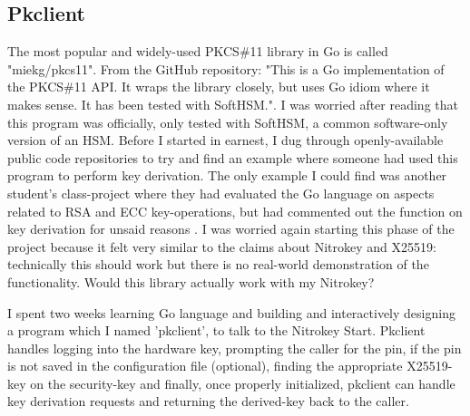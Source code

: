 \documentclass [11pt, proquest] {uwthesis}[2020/02/24]
\begin{document}
\subsection{Pkclient}
\label{pk_design}
The most popular and widely-used PKCS\#11 library in Go is called "miekg/pkcs11". From the GitHub repository: "This is a Go implementation of the PKCS\#11 API. It wraps the library closely, but uses Go idiom where it makes sense. It has been tested with SoftHSM."\cite{gieben_pkcs11_2022}. 
I was worried after reading that this program was officially, only tested with SoftHSM, a common software-only version of an HSM. Before I started in earnest, I dug through openly-available public code repositories to try and find an example where someone had used this program to perform key derivation. The only example I could find was another student's class-project where they had evaluated the Go language on aspects related to RSA and ECC key-operations, but had commented out the function on key derivation for unsaid reasons \cite{quapka_go-analysis_2019}. I was worried again starting this phase of the project because it felt very similar to the claims about Nitrokey and X25519: technically this should work but there is no real-world demonstration of the functionality. Would this library actually work with my Nitrokey?

I spent two weeks learning Go language and building and interactively designing a program which I named 'pkclient', to talk to the Nitrokey Start. Pkclient handles logging into the hardware key, prompting the caller for the pin, if the pin is not saved in the configuration file (optional), finding the appropriate X25519-key on the security-key and finally, once properly initialized, pkclient can handle key derivation requests and returning the derived-key back to the caller.




\end{document}
